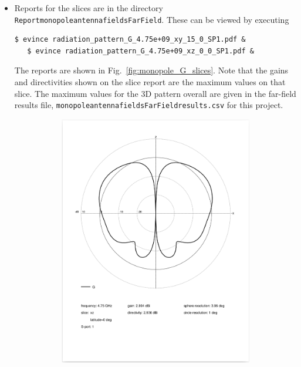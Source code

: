 \documentclass[titlepage]{article}
\renewcommand\_{\textunderscore\linebreak[1]}
\begin{document}
\begin{itemize}
\item Reports for the slices are in the directory \texttt{Report\_monopole\_antenna\_fields\_FarField}.  These can be viewed by executing
\begin{Verbatim}[fontsize=\small]
   $ evince radiation_pattern_G_4.75e+09_xy_15_0_SP1.pdf &
   $ evince radiation_pattern_G_4.75e+09_xz_0_0_SP1.pdf &
\end{Verbatim}
\noindent The reports are shown in Fig.~\ref{fig:monopole_G_slices}.  Note that the gains and directivities shown on the slice report are the maximum values on that slice.  The maximum values for the 3D pattern overall are given in the far-field results file, \texttt{monopole\_antenna\_fields\_FarField\_results.csv} for this project.

\begin{figure}[H]
  \centering
  \begin{subfigure}{0.408\textwidth}
     \includegraphics[width=\linewidth]{../tutorials/OpenParEM3D/monopole_antenna/screenshots/radiation_pattern_G_4.75e+09_xz_0_180_SP1}

\end{subfigure}
\end{figure}
\end{itemize}
\end{document}
